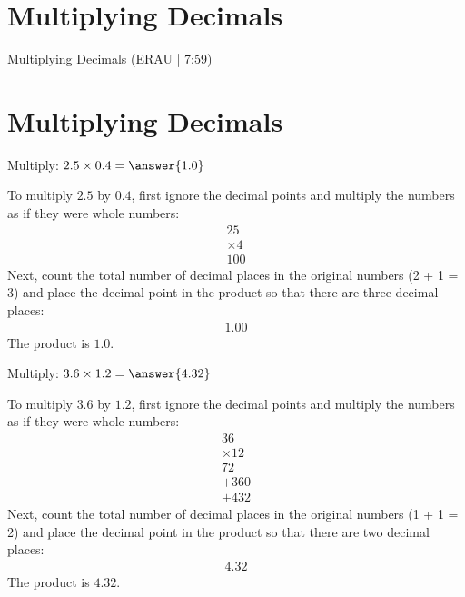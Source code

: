 \documentclass{ximera}
\begin{document}

\section*{Multiplying Decimals}

Multiplying Decimals (ERAU | 7:59)



\section*{Multiplying Decimals}

\begin{problem}
Multiply: $2.5 \times 0.4 = \answer{1.0}$
\begin{feedback}
To multiply $2.5$ by $0.4$, first ignore the decimal points and multiply the numbers as if they were whole numbers:
\begin{align*}
  25 \\
\times 4 \\
\hline
  100
\end{align*}
Next, count the total number of decimal places in the original numbers (2 + 1 = 3) and place the decimal point in the product so that there are three decimal places:
\begin{align*}
  1.00
\end{align*}
The product is $1.0$.
\end{feedback}
\end{problem}

\begin{problem}
Multiply: $3.6 \times 1.2 = \answer{4.32}$
\begin{feedback}
To multiply $3.6$ by $1.2$, first ignore the decimal points and multiply the numbers as if they were whole numbers:
\begin{align*}
   36 \\
\times   12 \\
\hline
   72 \\
+360 \\
\hline
+432
\end{align*}
Next, count the total number of decimal places in the original numbers (1 + 1 = 2) and place the decimal point in the product so that there are two decimal places:
\begin{align*}
   4.32
\end{align*}
The product is $4.32$.
\end{feedback}
\end{problem}
\end{document}

